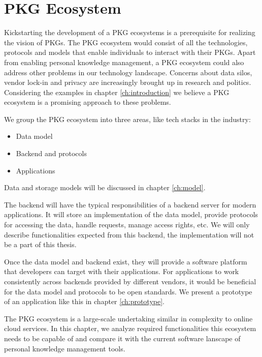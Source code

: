 \chapter{PKG Ecosystem} \label{ch:ecosystem}

Kickstarting the development of a PKG ecosystems is a prerequisite for realizing the vision of PKGs. The PKG ecosystem would consist of all the technologies, protocols and models that enable individuals to interact with their PKGs. Apart from enabling personal knowledge management, a PKG ecosystem could also address other problems in our technology landscape. Concerns about data silos, vendor lock-in and privacy are increasingly brought up in research and politics. Considering the examples in chapter \ref{ch:introduction} we believe a PKG ecosystem is a promising approach to these problems.

We group the PKG ecosystem into three areas, like tech stacks in the industry:

\begin{itemize}
    \item Data model
    \item Backend and protocols
    \item Applications
\end{itemize}

Data and storage models will be discussed in chapter \ref{ch:model}.

The backend will have the typical responsibilities of a backend server for modern applications. It will store an implementation of the data model, provide protocols for accessing the data, handle requests, manage access rights, etc.
We will only describe functionalities expected from this backend, the implementation will not be a part of this thesis.

Once the data model and backend exist, they will provide a software platform that developers can target with their applications. For applications to work consistently across backends provided by different vendors, it would be beneficial for the data model and protocols to be open standards.
We present a prototype of an application like this in chapter \ref{ch:prototype}.

The PKG ecosystem is a large-scale undertaking similar in complexity to online cloud services. In this chapter, we analyze required functionalities this ecosystem needs to be capable of and compare it with the current software lanscape of personal knowledge management tools.

